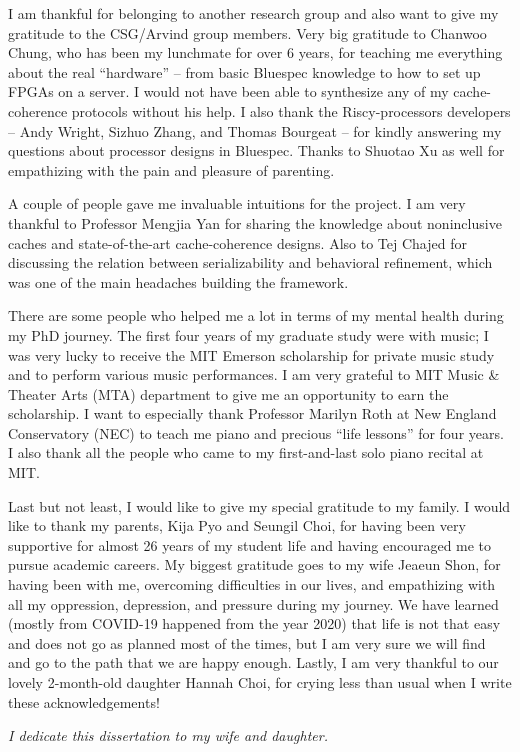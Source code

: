 I am thankful for belonging to another research group and also want to give my gratitude to the CSG/Arvind group members.
Very big gratitude to Chanwoo Chung, who has been my lunchmate for over 6 years, for teaching me everything about the real ``hardware'' -- from basic Bluespec knowledge to how to set up FPGAs on a server.
I would not have been able to synthesize any of my \hemiola{} cache-coherence protocols without his help.
I also thank the Riscy-processors developers -- Andy Wright, Sizhuo Zhang, and Thomas Bourgeat -- for kindly answering my questions about processor designs in Bluespec.
Thanks to Shuotao Xu as well for empathizing with the pain and pleasure of parenting.

A couple of people gave me invaluable intuitions for the \hemiola{} project.
I am very thankful to Professor Mengjia Yan for sharing the knowledge about noninclusive caches and state-of-the-art cache-coherence designs.
Also to Tej Chajed for discussing the relation between serializability and behavioral refinement, which was one of the main headaches building the framework.

There are some people who helped me a lot in terms of my mental health during my PhD journey.
The first four years of my graduate study were with music; I was very lucky to receive the MIT Emerson scholarship for private music study and to perform various music performances.
I am very grateful to MIT Music \& Theater Arts (MTA) department to give me an opportunity to earn the scholarship.
I want to especially thank Professor Marilyn Roth at New England Conservatory (NEC) to teach me piano and precious ``life lessons'' for four years.
I also thank all the people who came to my first-and-last solo piano recital at MIT.

Last but not least, I would like to give my special gratitude to my family.
I would like to thank my parents, Kija Pyo and Seungil Choi, for having been very supportive for almost 26 years of my student life and having encouraged me to pursue academic careers.
My biggest gratitude goes to my wife Jeaeun Shon, for having been with me, overcoming difficulties in our lives, and empathizing with all my oppression, depression, and pressure during my journey.
We have learned (mostly from COVID-19 happened from the year 2020) that life is not that easy and does not go as planned most of the times, but I am very sure we will find and go to the path that we are happy enough.
Lastly, I am very thankful to our lovely 2-month-old daughter Hannah Choi, for crying less than usual when I write these acknowledgements!

\emph{I dedicate this dissertation to my wife and daughter.}
